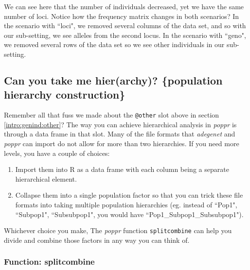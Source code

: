 \documentclass[letterpaper]{article}\usepackage[]{graphicx}\usepackage[]{color}
\newcommand{\tab}{\hspace*{1em}}
\begin{document}
We can see here that the number of individuals decreased, yet we have the same number of loci. Notice how the frequency matrix changes in both scenarios? In the scenario with ``loci", we removed several columns of the data set, and so with our sub-setting, we see alleles from the second locus. In the scenario with ``geno", we removed several rows of the data set so we see other individuals in our sub-setting.
\subsection{Can you take me hier(archy)? \{population hierarchy construction\}}\label{data.manip:hier}

\tab\tab Remember all that fuss we made about the \texttt{@other} slot above in section \ref{intro:genind:other}? The way you can achieve hierarchical analysis in \textit{poppr} is through a data frame in that slot. Many of the file formats that \textit{adegenet} and \textit{poppr} can import do not allow for more than two hierarchies. If you need more levels, you have a couple of choices: 
\begin{enumerate}
  \item Import them into R as a data frame with each column being a separate hierarchical element.
  \item Collapse them into a single population factor so that you can trick these file formats into taking multiple population hierarchies (eg. instead of ``Pop1", ``Subpop1", ``Subsubpop1", you would have ``Pop1\_Subpop1\_Subsubpop1"). 
\end{enumerate}
Whichever choice you make, The \textit{poppr} function \texttt{splitcombine} can help you divide and combine those factors in any way you can think of.
\subsubsection{Function: splitcombine}\label{data.manip:hier:splitcombine}
\end{document}
